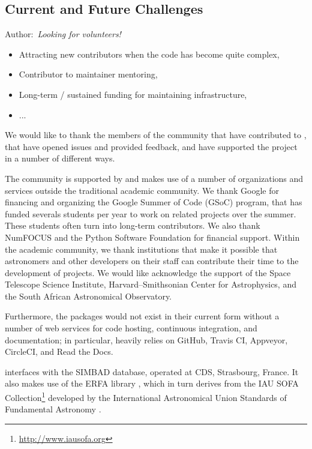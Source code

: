 \documentclass[modern]{aastex631}
\newcommand{\secunfilled}{{\color{red}Author:~\textit{Looking for volunteers!}}}
\begin{document}
\subsection{Current and Future Challenges}

\secunfilled

\begin{itemize}
\item Attracting new contributors when the code has become quite complex,
\item Contributor to maintainer mentoring,
\item Long-term / sustained funding for maintaining infrastructure,
\item ...
\end{itemize}


\begin{acknowledgments}

We would like to thank the members of the community that have contributed to
\astropy, that have opened issues and provided feedback, and have supported the
project in a number of different ways.

The \astropy community is supported by and makes use
of a number of organizations and services outside the traditional
academic community. We thank Google for financing and organizing the
Google Summer of Code (GSoC) program, that has funded severals
students per year to work on \astropy related projects over the
summer. These students often turn into long-term contributors. We also
thank NumFOCUS and the Python Software Foundation for financial
support. Within the academic community, we thank
institutions that make it possible that astronomers and other developers on
their staff can contribute their time to the development of
\astropy projects.  We would like acknowledge the support of the
Space Telescope Science Institute, Harvard--Smithsonian Center for Astrophysics,
and the South African Astronomical Observatory.

Furthermore, the \astropy packages would not exist in their current form without
a number of web services for code hosting, continuous integration, and
documentation; in particular, \astropy heavily relies on GitHub, Travis CI,
Appveyor, CircleCI, and Read the Docs.

\astropypkg interfaces with the SIMBAD database, operated at CDS, Strasbourg,
France. It also makes use of the ERFA library \citep{erfa}, which in turn
derives from the IAU SOFA Collection\footnote{\url{http://www.iausofa.org}}
developed by the International Astronomical Union Standards of Fundamental
Astronomy \citep{sofa}.

\end{acknowledgments}
\end{document}
